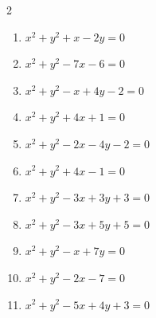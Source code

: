 \begin{multicols}{2}
\begin{enumerate}
  \item $x^{2}+y^{2}+x-2y=0$


  \item $x^{2}+y^{2}-7x-6=0$


  \item $x^{2}+y^{2}-x+4y-2=0$


  \item $x^{2}+y^{2}+4x+1=0$


  \item $x^{2}+y^{2}-2x-4y-2=0$


  \item $x^{2}+y^{2}+4x-1=0$


  \item $x^{2}+y^{2}-3x+3y+3=0$


  \item $x^{2}+y^{2}-3x+5y+5=0$


  \item $x^{2}+y^{2}-x+7y=0$


  \item $x^{2}+y^{2}-2x-7=0$


\columnbreak %

\resetques

  \item $x^{2}+y^{2}-5x+4y+3=0$


\end{enumerate}
\end{multicols}
